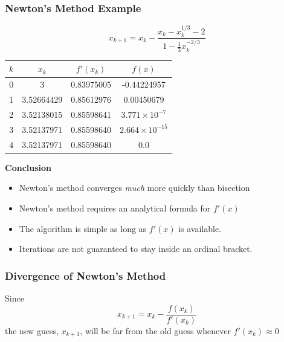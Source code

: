 \documentclass[10pt]{beamer}
\begin{document}
\begin{frame}
\frametitle{Newton's Method Example}


\begin{equation*}
    x_{k+1} = x_k - \frac{x_k - x_k^{1/3} - 2}{1 - \frac{1}{3}x_k^{-2/3}}
\end{equation*}

\vspace{2ex}
\begin{center}
  \small
    \renewcommand{\arraystretch}{1.3}
    \begin{tabular}{cccc}
    $k$ &    $x_k$     & $f'(x_k)$  &   $f(x)$                   \\ \hline
     0  &  3           & 0.83975005 & -0.44224957                \\
     1  &  3.52664429  & 0.85612976 &  0.00450679                \\
     2  &  3.52138015  & 0.85598641 &  $3.771\times 10^{-7}$   \\
     3  &  3.52137971  & 0.85598640 &  $2.664\times 10^{-15}$ \\
     4  &  3.52137971  & 0.85598640 &  0.0                       \\
    \end{tabular}
\end{center}

\vspace{2ex}

\textbf{Conclusion}
\vspace{0.0cm}
\begin{itemize}
    \item   Newton's method converges \emph{much} more quickly than bisection
    \item   Newton's method requires an analytical formula for $f'(x)$
    \item   The algorithm is simple as long as $f'(x)$ is available.
    \item   Iterations are not guaranteed to stay inside an ordinal bracket.
\end{itemize}




\end{frame}
\begin{frame}
\frametitle{Divergence of Newton's Method}

\vspace{4ex}
\begin{center}
\end{center}

\vspace{3ex}
Since
\begin{equation*}
    x_{k+1} = x_k - \frac{f(x_k)}{f'(x_k)}
\end{equation*}
the new guess, $x_{k+1}$, will be far from the old guess
whenever $f'(x_k)\approx 0$




\end{frame}
\end{document}
